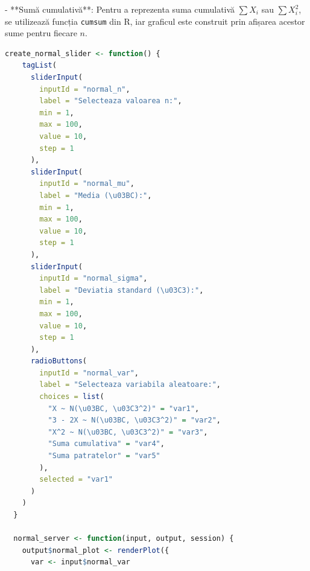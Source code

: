 \documentclass[a4paper,11pt]{article}
\begin{document}
- **Sumă cumulativă**: Pentru a reprezenta suma cumulativă \( \sum X_i \) sau \( \sum X_i^2 \), se utilizează funcția \texttt{cumsum} din R, iar graficul este construit prin afișarea acestor sume pentru fiecare \( n \).

\begin{lstlisting}[language=R]
  create_normal_slider <- function() {
    tagList(
      sliderInput(
        inputId = "normal_n",
        label = "Selecteaza valoarea n:",
        min = 1,
        max = 100,
        value = 10,
        step = 1
      ),
      sliderInput(
        inputId = "normal_mu",
        label = "Media (\u03BC):",
        min = 1,
        max = 100,
        value = 10,
        step = 1
      ),
      sliderInput(
        inputId = "normal_sigma",
        label = "Deviatia standard (\u03C3):",
        min = 1,
        max = 100,
        value = 10,
        step = 1
      ),
      radioButtons(
        inputId = "normal_var",
        label = "Selecteaza variabila aleatoare:",
        choices = list(
          "X ~ N(\u03BC, \u03C3^2)" = "var1",
          "3 - 2X ~ N(\u03BC, \u03C3^2)" = "var2",
          "X^2 ~ N(\u03BC, \u03C3^2)" = "var3",
          "Suma cumulativa" = "var4",
          "Suma patratelor" = "var5"
        ),
        selected = "var1"
      )
    )
  }
  
  normal_server <- function(input, output, session) {
    output$normal_plot <- renderPlot({
      var <- input$normal_var
      

\end{lstlisting}
\end{document}
